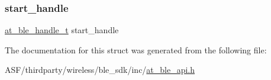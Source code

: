\mbox{\label{structat__ble__included__service__found__t_ac7742bb811cf20fa3215e3d2129b6b26}} 
\subsubsection{\texorpdfstring{start\_handle}{start\_handle}}
{\footnotesize\ttfamily \mbox{\hyperlink{at__ble__api_8h_abd23646d0c662860741f787efc8456f2}{at\+\_\+ble\+\_\+handle\+\_\+t}} start\+\_\+handle}



The documentation for this struct was generated from the following file\+:\begin{DoxyCompactItemize}
\item 
A\+S\+F/thirdparty/wireless/ble\+\_\+sdk/inc/\mbox{\hyperlink{at__ble__api_8h}{at\+\_\+ble\+\_\+api.\+h}}\end{DoxyCompactItemize}
